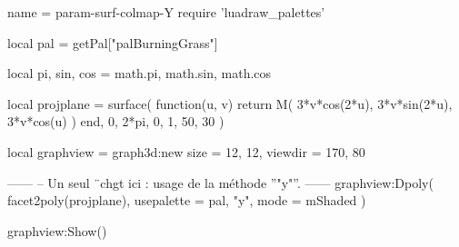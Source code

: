 \documentclass{standalone}
\begin{document}
\begin{luadraw}{name = param-surf-colmap-Y}
require 'luadraw_palettes'

local pal = getPal["palBurningGrass"]

local pi, sin, cos = math.pi, math.sin, math.cos

local projplane = surface(
  function(u, v)
    return M(
      3*v*cos(2*u),
      3*v*sin(2*u),
      3*v*cos(u)
    )
  end,
  0, 2*pi, 0, 1,
  {50, 30}
)

local graphview = graph3d:new{
  size    = {12, 12},
  viewdir = {170, 80}
}

------
-- Un seul ¨chgt ici : usage de la méthode ''"y"''.
------
graphview:Dpoly(
  facet2poly(projplane), 
  {
    usepalette = {pal, "y"},
    mode       = mShaded
  }
)

graphview:Show()
\end{luadraw}
\end{document}
